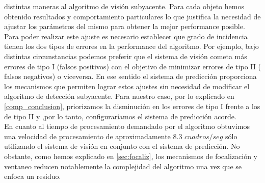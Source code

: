 distintas maneras al algoritmo de visi\'on subyacente. Para cada objeto 
hemos obtenido resultados y comportamiento particulares lo que 
justifica la necesidad de ajustar los par\'ametros del mismo para obtener la mejor 
performance posible. Para poder realizar este ajuste es necesario 
establecer que grado de incidencia tienen los dos tipos de errores en la performance del
algoritmo. Por ejemplo, bajo distintas circunstancias podemos preferir que el  
sistema de visi\'on cometa m\'as errores de tipo I (falsos positivos) con 
el objetivo de minimizar errores de tipo II ( falsos negativos) o 
viceversa. En ese sentido el sistema de predicci\'on proporciona los mecanismos que 
permiten lograr estos ajustes sin necesidad de modificar el algoritmo de detecci\'on 
subyacente. Para nuestro caso, por lo explicado en \ref{comp_conclusion}, priorizamos 
la disminuci\'on en los errores de tipo I frente a los de tipo II y ,por lo tanto, configurar\'iamos
el sistema de predicci\'on acorde.\\
\indent En cuanto al tiempo de procesamiento demandado por el algoritmo obtuvimos
una velocidad de procesamiento de aproximadamente $8.3$ $cuadros/seg$ s\'olo utilizando
el sistema de visi\'on en conjunto con el sistema de predicci\'on. No obstante, como hemos explicado
en \ref{sec:focaliz}, los mecanismos de focalizaci\'on y ventaneo reducen notablemente la
complejidad del algoritmo una vez que se enfoca un residuo.
 

